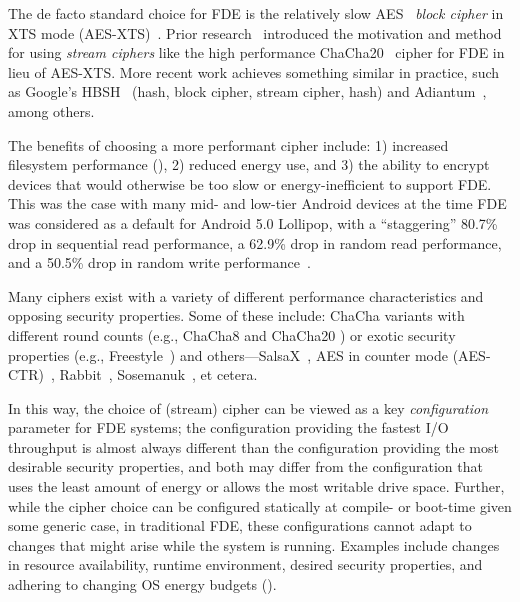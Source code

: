 The de facto standard choice for FDE is the relatively slow AES~\cite{AES}
\emph{block cipher} in XTS mode (AES-XTS)~\cite{AES-XTS}. Prior
research~\cite{StrongBox} introduced the motivation and method for using
\emph{stream ciphers} like the high performance ChaCha20~\cite{ChaCha20} cipher
for FDE in lieu of AES-XTS. More recent work achieves something similar in practice, such as
Google's HBSH~\cite{HBSH} (hash, block cipher, stream cipher, hash) and
Adiantum~\cite{Adiantum}, among others.

The benefits of choosing a more performant cipher include: 1) increased
filesystem performance (), 2) reduced energy
use, and 3) the ability to encrypt devices that would otherwise be too slow or
energy-inefficient to support FDE. This was the case with many mid- and low-tier
Android devices at the time FDE was considered as a default for Android 5.0
Lollipop, with a ``staggering'' 80.7\% drop in sequential read performance, a
62.9\% drop in random read performance, and a 50.5\% drop in random write
performance~\cite{android-M-mobile-motivation-2}. 

Many ciphers exist with a variety of different performance characteristics and
opposing security properties. Some of these include: ChaCha variants with
different round counts (e.g., ChaCha8 \cite{ChaCha8} and ChaCha20
\cite{ChaCha20}) or exotic security properties (e.g.,
Freestyle~\cite{Freestyle}) and others---SalsaX~\cite{SalsaX}, AES in counter
mode (AES-CTR)~\cite{AES-CTR}, Rabbit~\cite{Rabbit}, Sosemanuk~\cite{Sosemanuk},
et cetera. 

In this way, the choice of (stream) cipher can be viewed as a key
\emph{configuration} parameter for FDE systems; the configuration
providing the fastest I/O throughput is almost always different than the
configuration providing the most desirable security properties, and both may
differ from the configuration that uses the least amount of energy or allows the
most writable drive space. Further, while the cipher choice can be configured
statically at compile- or boot-time given some generic case, in traditional FDE,
these configurations cannot adapt to changes that might arise while the system
is running. Examples include changes in resource availability, runtime
environment, desired security properties, and adhering to changing OS energy
budgets ().


